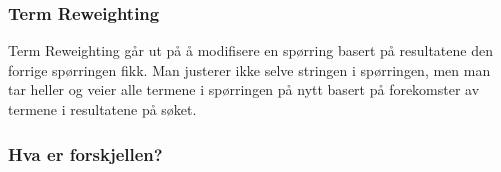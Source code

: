 \subsubsection*{Term Reweighting}
Term Reweighting går ut på å modifisere en spørring basert på resultatene den forrige spørringen fikk. Man justerer ikke selve stringen i spørringen, men man tar heller og veier alle termene i spørringen på nytt basert på forekomster av termene i resultatene på søket.
\subsubsection*{Hva er forskjellen?}



\pagebreak

